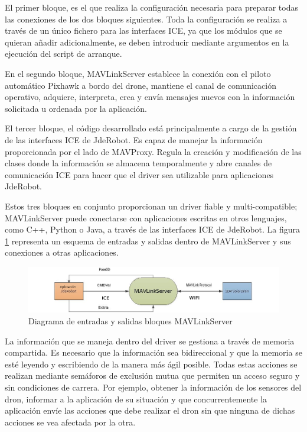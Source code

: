 El primer bloque, es el que realiza la configuración necesaria para preparar todas las conexiones de los dos bloques siguientes. Toda la configuración se realiza a través de un único fichero para las interfaces ICE, ya que los módulos que se quieran añadir adicionalmente, se deben introducir mediante argumentos en la ejecución del script de arranque.

En el segundo bloque, MAVLinkServer establece la conexión con el piloto automático Pixhawk a bordo del drone, mantiene el canal de comunicación operativo, adquiere, interpreta, crea y envía mensajes nuevos con la información solicitada u ordenada por la aplicación.

El tercer bloque, el código desarrollado está principalmente a cargo de la gestión de las interfaces ICE de JdeRobot. Es capaz de manejar la información proporcionada por el lado de MAVProxy. Regula la creación y modificación de las clases donde la información se almacena temporalmente y abre canales de comunicación ICE para hacer que el driver sea utilizable para aplicaciones JdeRobot.

Estos tres bloques en conjunto proporcionan un driver fiable y multi-compatible; MAVLinkServer puede conectarse con aplicaciones escritas en otros lenguajes, como C++, Python o Java, a través de las interfaces ICE de JdeRobot. La figura \ref{fig:mavLinkJdeRobotNegra} representa un esquema de entradas y salidas dentro de MAVLinkServer y sus conexiones a otras aplicaciones.


\begin{figure}[H]
  \centering
  \includegraphics[scale=0.65]{imagenes/cajaNegraNueva.png}
  \caption{Diagrama de entradas y salidas bloques MAVLinkServer}
  \label{fig:mavLinkJdeRobotNegra}
\end{figure}

La información que se maneja dentro del driver se gestiona a través de memoria compartida. Es necesario que la información sea bidireccional y que la memoria se esté leyendo y escribiendo de la manera más ágil posible. Todas estas acciones se realizan mediante semáforos de exclusión mutua que permiten un acceso seguro y sin condiciones de carrera. Por ejemplo, obtener la información de los sensores del dron, informar a la aplicación de su situación y que concurrentemente la aplicación envíe las acciones que debe realizar el dron sin que ninguna de dichas acciones se vea afectada por la otra.

